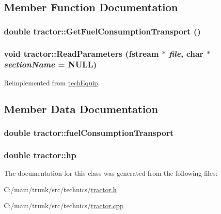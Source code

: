 \subsection{Member Function Documentation}
\hypertarget{classtractor_a6dc78ca234cc9f33199ad9560a587ef7}{
\subsubsection[{GetFuelConsumptionTransport}]{\setlength{\rightskip}{0pt plus 5cm}double tractor::GetFuelConsumptionTransport ()}}
\label{classtractor_a6dc78ca234cc9f33199ad9560a587ef7}
\hypertarget{classtractor_aeb535e7ae93c012609c660369ed23f3c}{
\subsubsection[{ReadParameters}]{\setlength{\rightskip}{0pt plus 5cm}void tractor::ReadParameters (fstream $\ast$ {\em file}, \/  char $\ast$ {\em sectionName} = {\ttfamily NULL})}}
\label{classtractor_aeb535e7ae93c012609c660369ed23f3c}


Reimplemented from \hyperlink{classtech_equip_a7b8543a8ead2be2a6a00d80123895e2c}{techEquip}.

\subsection{Member Data Documentation}
\hypertarget{classtractor_ab85c7fb537aeb6af66eedaa19ce5bd76}{
\subsubsection[{fuelConsumptionTransport}]{\setlength{\rightskip}{0pt plus 5cm}double {\bf tractor::fuelConsumptionTransport}}}
\label{classtractor_ab85c7fb537aeb6af66eedaa19ce5bd76}
\hypertarget{classtractor_a2b9a49491b1db7c4a7919eba64f319cd}{
\subsubsection[{hp}]{\setlength{\rightskip}{0pt plus 5cm}double {\bf tractor::hp}}}
\label{classtractor_a2b9a49491b1db7c4a7919eba64f319cd}


The documentation for this class was generated from the following files:\begin{DoxyCompactItemize}
\item 
C:/main/trunk/src/technics/\hyperlink{tractor_8h}{tractor.h}\item 
C:/main/trunk/src/technics/\hyperlink{tractor_8cpp}{tractor.cpp}\end{DoxyCompactItemize}
